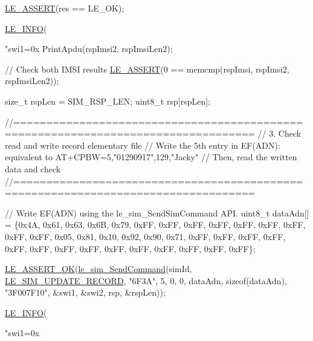 \begin{DoxyCodeInclude}
    \hyperlink{le__log_8h_ac0dbbef91dc0fed449d0092ff0557b39}{LE\_ASSERT}(res == LE\_OK);

    \hyperlink{le__log_8h_a23e6d206faa64f612045d688cdde5808}{LE\_INFO}(\textcolor{stringliteral}{"swi1=0x%
    PrintApdu(rspImsi2, rspImsiLen2);

    \textcolor{comment}{// Check both IMSI results}
    \hyperlink{le__log_8h_ac0dbbef91dc0fed449d0092ff0557b39}{LE\_ASSERT}(0 == memcmp(rspImsi, rspImsi2, rspImsiLen2));

    \textcolor{keywordtype}{size\_t} rspLen = SIM\_RSP\_LEN;
    uint8\_t rsp[rspLen];

    \textcolor{comment}{//==================================================================================}
    \textcolor{comment}{// 3. Check read and write record elementary file}
    \textcolor{comment}{// Write the 5th entry in EF(ADN): equivalent to AT+CPBW=5,"01290917",129,"Jacky"}
    \textcolor{comment}{// Then, read the written data and check}
    \textcolor{comment}{//==================================================================================}

    \textcolor{comment}{// Write EF(ADN) using the le\_sim\_SendSimCommand API.}
    uint8\_t dataAdn[] = \{0x4A, 0x61, 0x63, 0x6B, 0x79, 0xFF, 0xFF, 0xFF, 0xFF, 0xFF,
                         0xFF, 0xFF, 0xFF, 0xFF, 0x05, 0x81, 0x10, 0x92, 0x90, 0x71,
                         0xFF, 0xFF, 0xFF, 0xFF, 0xFF, 0xFF, 0xFF, 0xFF, 0xFF, 0xFF,
                         0xFF, 0xFF, 0xFF, 0xFF\};

    \hyperlink{le__log_8h_a7cd2daa3d4af1de4d29e0eed95187484}{LE\_ASSERT\_OK}(\hyperlink{le__sim__interface_8h_a8bbaea044b44f8b0ebff67bf98de816a}{le\_sim\_SendCommand}(simId,
                                    \hyperlink{le__sim__interface_8h_ac1a708ba305c36e33383073ec7f0e331a73f253861a66d9f1689fbdb97263019e}{LE\_SIM\_UPDATE\_RECORD},
                                    \textcolor{stringliteral}{"6F3A"},
                                    5,
                                    0,
                                    0,
                                    dataAdn,
                                    \textcolor{keyword}{sizeof}(dataAdn),
                                    \textcolor{stringliteral}{"3F007F10"},
                                    &swi1,
                                    &swi2,
                                    rsp,
                                    &rspLen));

    \hyperlink{le__log_8h_a23e6d206faa64f612045d688cdde5808}{LE\_INFO}(\textcolor{stringliteral}{"swi1=0x%

}}
\end{DoxyCodeInclude}
